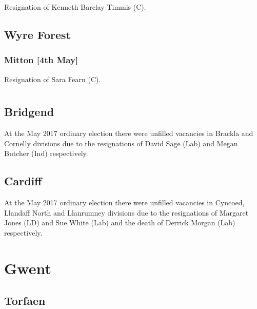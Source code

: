 \documentclass[a4paper,openany]{book}
\begin{document}
\begin{resultsiii}
Resignation of Kenneth Barclay-Timmis (C).

\subsection*{Wyre Forest}

\subsubsection*{Mitton \hspace*{\fill}\nolinebreak[1]%
\enspace\hspace*{\fill}
[4th May]}


Resignation of Sara Fearn (C).

\section[Glamorgan]{}

\subsection*{Bridgend}

At the May 2017 ordinary election there were unfilled vacancies in Brackla and Cornelly divisions due to the resignations of David Sage (Lab) and Megan Butcher (Ind) respectively.

\subsection*{Cardiff}

At the May 2017 ordinary election there were unfilled vacancies in Cyncoed, Llandaff North and Llanrumney divisions due to the resignations of Margaret Jones (LD) and Sue White (Lab) and the death of Derrick Morgan (Lab) respectively.

\section{Gwent}

\subsection*{Torfaen}


\end{resultsiii}
\end{document}
